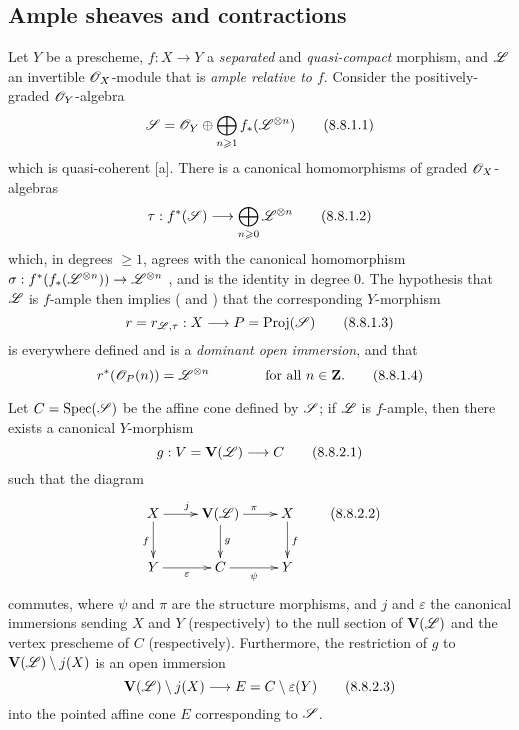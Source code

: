 \subsection{Ample sheaves and contractions}
\label{subsection:II.8.8}

\begin{env}[8.8.1]
\label{II.8.8.1}
Let $Y$ be a prescheme, $f:X\to Y$ a \emph{separated} and \emph{quasi-compact} morphism, and $\mathscr{L}$ an invertible $\mathscr{O}_X$-module that is \emph{ample relative to $f$}.
Consider the positively-graded $\mathscr{O}_Y$-algebra
\[
\label{II.8.8.1.1}
  \mathscr{S} = \mathscr{O}_Y \oplus \bigoplus_{n\geqslant1}f_*(\mathscr{L}^{\otimes n})
\tag{8.8.1.1}
\]
which is quasi-coherent [a].
There is a canonical homomorphisms of graded $\mathscr{O}_X$-algebras
\[
\label{II.8.8.1.2}
  \tau: f^*(\sh{S}) \to \bigoplus_{n\geq0}\sh{L}^{\otimes n}
\tag{8.8.1.2}
\]
which, in degrees $\geq1$, agrees with the canonical homomorphism $\sigma:f^*(f_*(\sh{L}^{\otimes n})) \to \sh{L}^{\otimes n}$ , and is the identity in degree 0.
The hypothesis that $\mathscr{L}$ is $f$-ample then implies ( and ) that the corresponding $Y$-morphism
\[
\label{II.8.8.1.3}
  r = r_{\sh{L},\tau} : X \to P = \Proj(\sh{S})
\tag{8.8.1.3}
\]
is everywhere defined and is a \emph{dominant open immersion}, and that
\[
\label{II.8.8.1.4}
  r^*(\mathscr{O}_P(n)) = \mathscr{L}^{\otimes n}
  \qquad\qquad
  \mbox{for all $n\in\mathbf{Z}$.}
\tag{8.8.1.4}
\]
\end{env}

\begin{proposition}[8.8.2]
\label{II.8.8.2}
Let $C=\operatorname{Spec}(\mathscr{S})$ be the affine cone defined by $\mathscr{S}$;
if $\mathscr{L}$ is $f$-ample, then there exists a canonical $Y$-morphism
\[
\label{II.8.8.2.1}
  g : V = \bb{V}(\sh{L}) \to C
\tag{8.8.2.1}
\]
such that the diagram
\[
\label{II.8.8.2.2}
  \xymatrix{
    X
      \ar[r]^{j}
      \ar[d]_{f}
  & \bb{V}(\sh{L})
      \ar[r]^{\pi}
      \ar[d]^{g}
  & X
      \ar[d]^{f}
  \\Y
      \ar[r]_{\varepsilon}
  & C
      \ar[r]_{\psi}
  & Y
  }
\tag{8.8.2.2}
\]
commutes, where $\psi$ and $\pi$ are the structure morphisms, and $j$ and $\varepsilon$ the canonical immersions sending $X$ and $Y$ (respectively) to the null section of $\mathbf{V}(\mathscr{L})$ and the vertex prescheme of $C$ (respectively).
Furthermore, the restriction of $g$ to $\mathbf{V}(\mathscr{L})\setminus j(X)$ is an open immersion
\[
\label{II.8.8.2.3}
  \bb{V}(\sh{L})\setminus j(X) \to E = C\setminus\varepsilon(Y)
\tag{8.8.2.3}
\]
into the pointed affine cone $E$ corresponding to $\mathscr{S}$.
\end{proposition}

